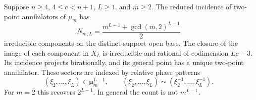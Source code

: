 \begin{theorem}
\label{thm:higher-phase}
Suppose $n\ge4$, $4\le c<n+1$, $L\ge1$, and $m\ge2$.
The reduced incidence of two-point annihilators of $\mu_m$ has
\begin{equation}\label{eq:dihedral-count}
 N_{m,L}=\frac{m^{L-1}+\gcd(m,2)^{L-1}}2
\end{equation}
irreducible components on the distinct-support open base. The closure
of the image of each component in $X_L$ is irreducible and rational
of codimension $Lc-3$. Its incidence projects birationally, and its
general point has a unique two-point annihilator.
These sectors are indexed by relative phase patterns
\[
 (\xi_2,\ldots,\xi_L)\in\boldsymbol\mu_m^{L-1},
 \qquad (\xi_2,\ldots,\xi_L)\sim
                     (\xi_2^{-1},\ldots,\xi_L^{-1}).
\]
For $m=2$ this recovers $2^{L-1}$. In general the count is not
$m^{L-1}$.
\end{theorem}
